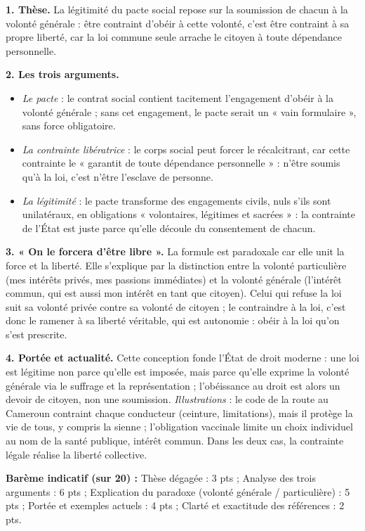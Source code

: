 \documentclass[11pt]{article}
\newcommand{\cle}[1]{{\popxbold\color{popdark}#1}}
\begin{document}
\begin{corrige}
\textbf{1. Thèse.} La légitimité du pacte social repose sur la soumission de chacun à la volonté générale : être contraint d'obéir à cette volonté, c'est être contraint à sa propre liberté, car la loi commune seule arrache le citoyen à toute dépendance personnelle.

\textbf{2. Les trois arguments.}
\begin{itemize}
    \item \emph{Le pacte} : le contrat social contient tacitement l'engagement d'obéir à la volonté générale ; sans cet engagement, le pacte serait un « vain formulaire », sans force obligatoire.
    \item \emph{La contrainte libératrice} : le corps social peut forcer le récalcitrant, car cette contrainte le « garantit de toute dépendance personnelle » : n'être soumis qu'à la loi, c'est n'être l'esclave de personne.
    \item \emph{La légitimité} : le pacte transforme des engagements civils, nuls s'ils sont unilatéraux, en obligations « volontaires, légitimes et sacrées » : la contrainte de l'État est juste parce qu'elle découle du consentement de chacun.
\end{itemize}

\textbf{3. « On le forcera d'être libre ».} La formule est paradoxale car elle unit la force et la liberté. Elle s'explique par la distinction entre la \cle{volonté particulière} (mes intérêts privés, mes passions immédiates) et la \cle{volonté générale} (l'intérêt commun, qui est aussi mon intérêt en tant que citoyen). Celui qui refuse la loi suit sa volonté privée contre sa volonté de citoyen ; le contraindre à la loi, c'est donc le ramener à sa liberté véritable, qui est autonomie : obéir à la loi qu'on s'est prescrite.

\textbf{4. Portée et actualité.} Cette conception fonde l'État de droit moderne : une loi est légitime non parce qu'elle est imposée, mais parce qu'elle exprime la volonté générale via le suffrage et la représentation ; l'obéissance au droit est alors un devoir de citoyen, non une soumission. \emph{Illustrations} : le code de la route au Cameroun contraint chaque conducteur (ceinture, limitations), mais il protège la vie de tous, y compris la sienne ; l'obligation vaccinale limite un choix individuel au nom de la santé publique, intérêt commun. Dans les deux cas, la contrainte légale réalise la liberté collective.

\textbf{Barème indicatif (sur 20) :} Thèse dégagée : 3 pts ; Analyse des trois arguments : 6 pts ; Explication du paradoxe (volonté générale / particulière) : 5 pts ; Portée et exemples actuels : 4 pts ; Clarté et exactitude des références : 2 pts.
\end{corrige}
\end{document}
